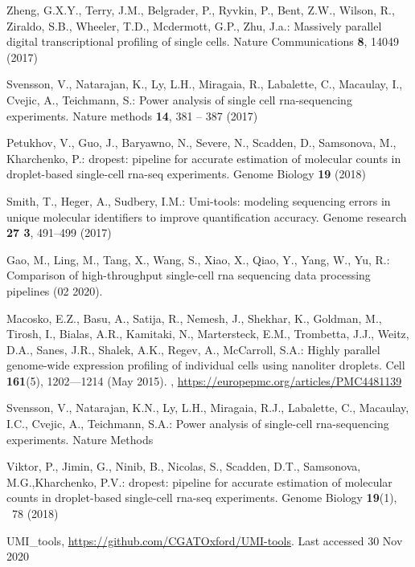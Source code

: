 \documentclass[runningheads]{llncs}
\begin{document}
\begin{thebibliography}{8}
Zheng, G.X.Y., Terry, J.M., Belgrader, P., Ryvkin, P., Bent, Z.W., Wilson, R.,
Ziraldo, S.B., Wheeler, T.D., Mcdermott, G.P., Zhu, J.a.: Massively parallel
digital transcriptional profiling of single cells. Nature Communications
\textbf{8},  14049 (2017)

Svensson, V., Natarajan, K., Ly, L.H., Miragaia, R., Labalette, C., Macaulay,
I., Cvejic, A., Teichmann, S.: Power analysis of single cell rna-sequencing
experiments. Nature methods  \textbf{14},  381 -- 387 (2017)

Petukhov, V., Guo, J., Baryawno, N., Severe, N., Scadden, D., Samsonova, M.,
Kharchenko, P.: dropest: pipeline for accurate estimation of molecular counts
in droplet-based single-cell rna-seq experiments. Genome Biology  \textbf{19}
(2018)

Smith, T., Heger, A., Sudbery, I.M.: Umi-tools: modeling sequencing errors in
unique molecular identifiers to improve quantification accuracy. Genome
research  \textbf{27 3},  491--499 (2017)

Gao, M., Ling, M., Tang, X., Wang, S., Xiao, X., Qiao, Y., Yang, W., Yu, R.:
Comparison of high-throughput single-cell rna sequencing data processing
pipelines  (02 2020). 

Macosko, E.Z., Basu, A., Satija, R., Nemesh, J., Shekhar, K., Goldman, M.,
Tirosh, I., Bialas, A.R., Kamitaki, N., Martersteck, E.M., Trombetta, J.J.,
Weitz, D.A., Sanes, J.R., Shalek, A.K., Regev, A., McCarroll, S.A.: Highly
parallel genome-wide expression profiling of individual cells using nanoliter
droplets. Cell  \textbf{161}(5),  1202—1214 (May 2015).
,
\url{https://europepmc.org/articles/PMC4481139}

Svensson, V., Natarajan, K.N., Ly, L.H., Miragaia, R.J., Labalette, C.,
Macaulay, I.C., Cvejic, A., Teichmann, S.A.: Power analysis of single-cell
rna-sequencing experiments. Nature Methods

Viktor, P., Jimin, G., Ninib, B., Nicolas, S., Scadden, D.T., Samsonova, M.G.,Kharchenko, P.V.: dropest: pipeline for accurate estimation of molecular
  counts in droplet-based single-cell rna-seq experiments. Genome Biology
\textbf{19}(1), ~78 (2018)

UMI\_tools, \url{https://github.com/CGATOxford/UMI-tools}. Last accessed 30
Nov 2020


\end{thebibliography}
\end{document}
